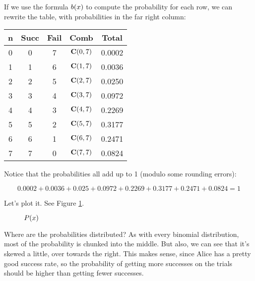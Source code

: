 \documentclass[../../../main.tex]{subfiles}
\begin{document}
\noindent
If we use the formula $\Binom{\RandVarVal/}$ to compute the probability for each row, we can rewrite the table, with probabilities in the far right column:

\begin{center}
  \begin{tabular}{| c | c | c | c | c |}
    \hline
  \textbf{n} & \textbf{Succ} & \textbf{Fail} & \textbf{Comb} & \textbf{Total} \\ \hline
  0 & 0    & 7    & $\mathbf{C}(0, 7)$ & 0.0002 \\ \hline
  1 & 1    & 6    & $\mathbf{C}(1, 7)$ & 0.0036 \\ \hline
  2 & 2    & 5    & $\mathbf{C}(2, 7)$ & 0.0250 \\ \hline
  3 & 3    & 4    & $\mathbf{C}(3, 7)$ & 0.0972 \\ \hline
  4 & 4    & 3    & $\mathbf{C}(4, 7)$ & 0.2269 \\ \hline
  5 & 5    & 2    & $\mathbf{C}(5, 7)$ & 0.3177 \\ \hline
  6 & 6    & 1    & $\mathbf{C}(6, 7)$ & 0.2471 \\ \hline
  7 & 7    & 0    & $\mathbf{C}(7, 7)$ & 0.0824 \\ \hline
  \end{tabular}
\end{center}

\noindent
Notice that the probabilities all add up to 1 (modulo some rounding errors):

\begin{equation*}
    0.0002 + 0.0036 + 0.025 + 0.0972 + 0.2269 + 0.3177 + 0.2471 + 0.0824 = 1
\end{equation*}

\noindent
Let's plot it. See Figure \ref{plot:example-3}.

\begin{figure}[ht]
  \caption{\label{plot:example-3} $\Probability{\RandVarVal/}$}
\end{figure}

Where are the probabilities distributed? As with every binomial distribution, most of the probability is chunked into the middle. But also, we can see that it's skewed a little, over towards the right. This makes sense, since Alice has a pretty good success rate, so the probability of getting more successes on the trials should be higher than getting fewer successes.
\end{document}
